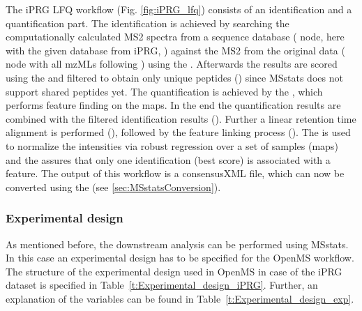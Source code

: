 \noindent The iPRG LFQ workflow (Fig. \ref{fig:iPRG_lfq}) consists of an identification and a quantification part. The identification is achieved by searching the computationally calculated MS2 spectra from a sequence database ( node, here with the given database from iPRG, ) against the MS2 from the original data ( node with all mzMLs following ) using the .
Afterwards the results are scored using the  and filtered to obtain only unique peptides () since MSstats does not support shared peptides yet. The quantification is achieved by the , which performs feature finding on the maps. In the end the quantification results are combined with the filtered identification results (). Further a linear retention time alignment is performed (), followed by the feature linking process (). The  is used to normalize the intensities via robust regression over a set of samples (maps) and the  assures that only one identification (best score) is associated with a feature. The output of this workflow is a consensusXML file, which can now be converted using the  (see \ref{sec:MSstatsConversion}). 

\subsubsection{Experimental design}
\noindent As mentioned before, the downstream analysis can be performed using MSstats. In this case an experimental design has to be specified for the OpenMS workflow. The structure of the experimental design used in OpenMS in case of the iPRG dataset is specified in Table~\ref{t:Experimental_design_iPRG}. Further, an explanation of the variables can be found in Table~\ref{t:Experimental_design_exp}. 


